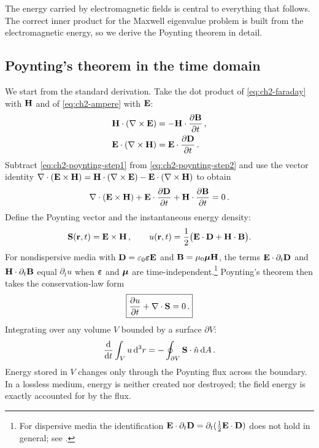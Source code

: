 The energy carried by electromagnetic fields is central to everything
that follows.  The correct inner product for the Maxwell eigenvalue
problem is built from the electromagnetic energy, so we derive the
Poynting theorem in detail.

\subsection{Poynting's theorem in the time domain}
\label{sec:ch2-poynting-time}

We start from the standard derivation.  Take the dot product of
\eqref{eq:ch2-faraday} with $\mathbf{H}$ and of \eqref{eq:ch2-ampere}
with $\mathbf{E}$:
\begin{align}
  \mathbf{H}\cdot(\nabla\times\mathbf{E})
  &= -\mathbf{H}\cdot\frac{\partial \mathbf{B}}{\partial t}\,,
  \label{eq:ch2-poynting-step1}\\
  \mathbf{E}\cdot(\nabla\times\mathbf{H})
  &= \mathbf{E}\cdot\frac{\partial \mathbf{D}}{\partial t}\,.
  \label{eq:ch2-poynting-step2}
\end{align}
Subtract \eqref{eq:ch2-poynting-step1} from
\eqref{eq:ch2-poynting-step2} and use the vector identity
$\nabla\cdot(\mathbf{E}\times\mathbf{H})
 =\mathbf{H}\cdot(\nabla\times\mathbf{E})
 -\mathbf{E}\cdot(\nabla\times\mathbf{H})$
to obtain
\begin{equation}\label{eq:ch2-poynting-differential}
  \nabla\cdot(\mathbf{E}\times\mathbf{H})
  + \mathbf{E}\cdot\frac{\partial \mathbf{D}}{\partial t}
  + \mathbf{H}\cdot\frac{\partial \mathbf{B}}{\partial t}
  = 0\,.
\end{equation}
Define the Poynting vector and the instantaneous energy density:
\begin{equation}\label{eq:ch2-poynting-defs}
  \mathbf{S}(\mathbf{r},t) = \mathbf{E}\times\mathbf{H}\,,
  \qquad
  u(\mathbf{r},t) = \frac{1}{2}\bigl(
    \mathbf{E}\cdot\mathbf{D} + \mathbf{H}\cdot\mathbf{B}
  \bigr).
\end{equation}
For nondispersive media with $\mathbf{D}=\varepsilon_0\boldsymbol{\varepsilon}\mathbf{E}$ and \cite{silveirinha2016bulk}
$\mathbf{B}=\mu_0\boldsymbol{\mu}\mathbf{H}$, the terms
$\mathbf{E}\cdot\partial_t\mathbf{D}$ and $\mathbf{H}\cdot\partial_t\mathbf{B}$
equal $\partial_t u$ when $\boldsymbol{\varepsilon}$ and $\boldsymbol{\mu}$ are
time-independent.\footnote{%
  For dispersive media the identification
  $\mathbf{E}\cdot\partial_t\mathbf{D}=\partial_t(\frac12\mathbf{E}\cdot\mathbf{D})$
  does not hold in general; see .}
Poynting's theorem then takes the conservation-law form
\begin{equation}\label{eq:ch2-poynting-conservation}
  \boxed{%
  \pderiv{u}{t} + \nabla\cdot\Sfield = 0\,.}
\end{equation}
Integrating over any volume $V$ bounded by a surface $\partial V$:
\begin{equation}
  \frac{\mathrm{d} }{\mathrm{d} t}\int_V u\,\mathrm{d}^3r
  = -\oint_{\partial V}\mathbf{S}\cdot\hat{n}\,\mathrm{d} A\,.
\end{equation}
Energy stored in $V$ changes only through the Poynting flux across the
boundary.  In a lossless medium, energy is neither created nor
destroyed; the field energy is exactly accounted for by the flux.

